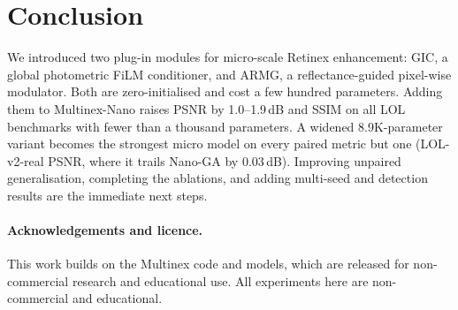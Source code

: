 \documentclass[10pt,twocolumn,letterpaper]{article}
\begin{document}
\section{Conclusion}
We introduced two plug-in modules for micro-scale Retinex enhancement: GIC, a
global photometric FiLM conditioner, and ARMG, a reflectance-guided pixel-wise
modulator. Both are zero-initialised and cost a few hundred parameters. Adding
them to Multinex-Nano raises PSNR by 1.0--1.9\,dB and SSIM on all LOL benchmarks
with fewer than a thousand parameters. A widened 8.9K-parameter variant becomes
the strongest micro model on every paired metric but one (LOL-v2-real PSNR, where it
trails Nano-GA by 0.03\,dB). Improving
unpaired generalisation, completing the ablations, and adding multi-seed and
detection results are the immediate next steps.

\paragraph{Acknowledgements and licence.}
This work builds on the Multinex code and models, which are released for
non-commercial research and educational use. All experiments here are
non-commercial and educational.

{\small


}

\appendix
\onecolumn
\end{document}
